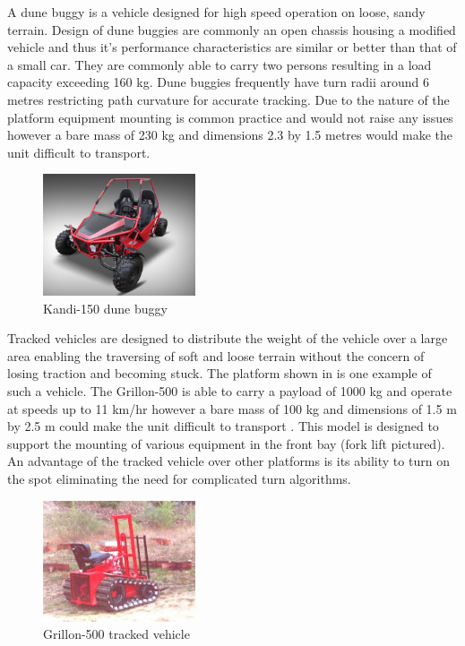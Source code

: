 \documentclass[main.tex]{subfiles}
\begin{document}
A dune buggy is a vehicle designed for high speed operation on loose, sandy terrain. Design of dune buggies are commonly an open chassis housing a modified vehicle and thus it's performance characteristics are similar or better than that of a small car. They are commonly able to carry two persons resulting in a load capacity exceeding 160 kg. Dune buggies frequently have turn radii around 6 metres restricting path curvature for accurate tracking. Due to the nature of the platform equipment mounting is common practice and would not raise any issues however a bare mass of 230 kg and dimensions 2.3 by 1.5 metres would make the unit difficult to transport.
\begin{figure}[ht]
\includegraphics[width=0.4\textwidth]{3-ConceptDesign/kandidunebuggy.jpg}
\centering
\caption[Kandi-150 dune buggy]{Kandi-150 dune buggy \parencite{150GKM}} 
\end{figure}

Tracked vehicles are designed to distribute the weight of the vehicle over a large area enabling the traversing of soft and loose terrain without the concern of losing traction and becoming stuck. The platform shown in  is one example of such a vehicle. The Grillon-500 is able to carry a payload of 1000 kg and operate at speeds up to 11 km/hr however a bare mass of 100 kg and dimensions of 1.5 m by 2.5 m could make the unit difficult to transport \parencite{cinamGrillon}. This model is designed to support the mounting of various equipment in the front bay (fork lift pictured). An advantage of the tracked vehicle over other platforms is its ability to turn on the spot eliminating the need for complicated turn algorithms. 
\begin{figure}[ht]
\includegraphics[width=0.4\textwidth]{3-ConceptDesign/Grillon-500.jpg}
\centering
\caption[Grillon-500 tracked vehicle]{Grillon-500 tracked vehicle \parencite{cinamGrillon}} 
\end{figure}
\end{document}
